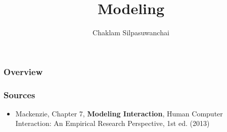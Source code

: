 \documentclass{beamer}
\title[Modeling]{Modeling} %
\author{Chaklam Silpasuwanchai} %
\institute[AIT] %
{
Asian Institute of Technology \\ %
\medskip
\textit{chaklam@ait.asia} %
}
\date{} %
\begin{document}
\begin{frame}
\titlepage %
\end{frame}

\begin{frame}
\frametitle{Overview} %
\tableofcontents %
\end{frame}




\begin{frame}
\frametitle{Sources} 
\begin{itemize}
	\item Mackenzie, Chapter 7, \textbf{Modeling Interaction},  Human Computer Interaction: An Empirical Research Perspective, 1st ed. (2013) 
\end{itemize}
\end{frame}

\end{document}
